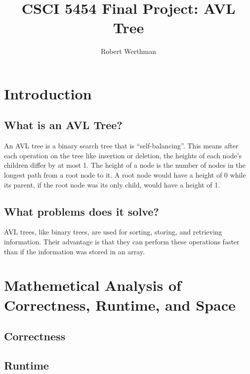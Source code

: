 \documentclass[12pt]{article}
\title{CSCI 5454 Final Project: AVL Tree}
\author{Robert Werthman}
\date{}
\begin{document}
\maketitle

\newpage
\tableofcontents

\newpage
{}
\section*{Introduction}

\subsection*{What is an AVL Tree?}

An AVL tree is a binary search tree that is ``self-balancing''.  This means
after each operation on the tree like insertion or deletion, the heights of each
node's children differ by at most 1.  The height of a node is the number of
nodes in the longest path from a root node to it.  A root node would have a
height of 0 while its parent, if the root node was its only child, would have a 
height of 1.

\subsection*{What problems does it solve?}
AVL trees, like binary trees, are used for sorting, storing, and retrieving
information.  Their advantage is that they can perform these operations faster
than if the information was stored in an array.

\section*{Mathemetical Analysis of Correctness, Runtime, and Space}

\subsection*{Correctness}

\subsection*{Runtime}
\end{document}
